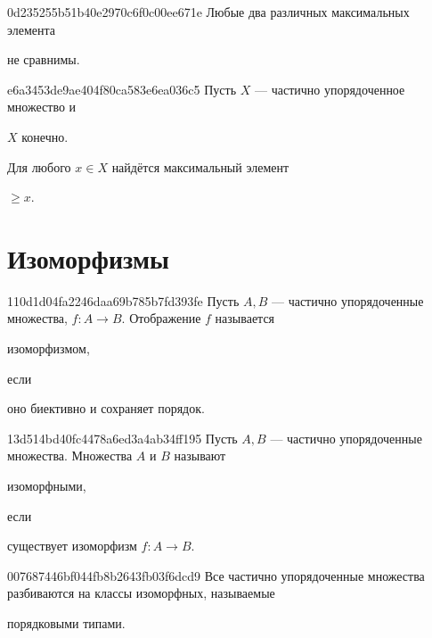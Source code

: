 \begin{note}{0d235255b51b40e2970c6f0c00ee671e}
    Любые два различных максимальных элемента \begin{icloze}{1}не сравнимы.\end{icloze}
\end{note}

\begin{note}{e6a3453de9ae404f80ca583e6ea036c5}
    Пусть \({ X }\) --- частично упорядоченное множество и \begin{icloze}{2}\({ X }\) конечно.\end{icloze}
    Для любого \({ x \in X }\) найдётся максимальный элемент \begin{icloze}{1}\({ \geqslant x }\).\end{icloze}
\end{note}

\section{Изоморфизмы}
\begin{note}{110d1d04fa2246daa69b785b7fd393fe}
    Пусть \({ A, B }\) --- частично упорядоченные множества, \({ f : A \to B }\).
    Отображение \({ f }\) называется \begin{icloze}{2}изоморфизмом,\end{icloze} если \begin{icloze}{1}оно биективно и сохраняет порядок.\end{icloze}
\end{note}

\begin{note}{13d514bd40fc4478a6ed3a4ab34ff195}
    Пусть \({ A, B }\) --- частично упорядоченные множества.
    Множества \({ A }\) и \({ B }\) называют \begin{icloze}{2}изоморфными,\end{icloze} если \begin{icloze}{1}существует изоморфизм \({ f : A \to B }\).\end{icloze}
\end{note}

\begin{note}{007687446bf044fb8b2643fb03f6dcd9}
    Все частично упорядоченные множества разбиваются на классы изоморфных, называемые \begin{icloze}{1}порядковыми типами.\end{icloze}
\end{note}

